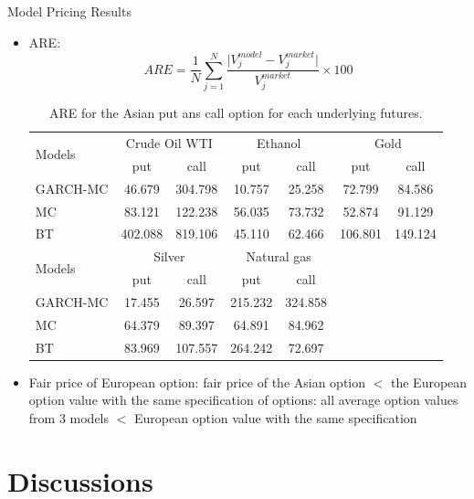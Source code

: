 \documentclass[8pt]{beamer}
\numberwithin{equation}{section}
\begin{document}
\begin{frame}{Model Pricing Results}
\begin{itemize}
\item ARE:
\begin{equation}\label{are}
ARE = \frac{1}{N} \sum^N_{j = 1} \frac{\vert V^{model}_j - V^{market}_j \vert}{V^{market}_j} \times 100
\end{equation}
\begin{table}
\centering
\footnotesize
\begin{tabular}{lcccccc}
\toprule
\multirow{2}{*}{Models}  & \multicolumn{2}{c}{Crude Oil WTI} & \multicolumn{2}{c}{Ethanol} & \multicolumn{2}{c}{Gold} \\
 & put & call & put & call & put & call  \\
\midrule
GARCH-MC & 46.679 & 304.798 & 10.757 & 25.258 & 72.799 & 84.586 \\ 
MC & 83.121 & 122.238 & 56.035 & 73.732 & 52.874 & 91.129 \\
BT & 402.088 & 819.106 & 45.110 & 62.466 & 106.801 & 149.124 \\
\toprule
\multirow{2}{*}{Models}  & \multicolumn{2}{c}{Silver} & \multicolumn{2}{c}{Natural gas} & & \\ & put & call & put & call  \\
\midrule
GARCH-MC & 17.455 & 26.597 & 215.232 & 324.858 \\ 
MC & 64.379 & 89.397 & 64.891 & 84.962 \\
BT & 83.969 & 107.557 & 264.242 & 72.697 \\
\bottomrule
\end{tabular}
\caption{ARE for the Asian put ans call option for each underlying futures.}
\label{are stat}
\end{table}
\item Fair price of European option: fair price of the Asian option $ < $ the European option value with the same specification of options: all average option values from 3 models $  <  $ European option value with the same specification
\end{itemize}
\end{frame}

\section{Discussions}

\frame{\tableofcontents[currentsection]}
\end{document}
